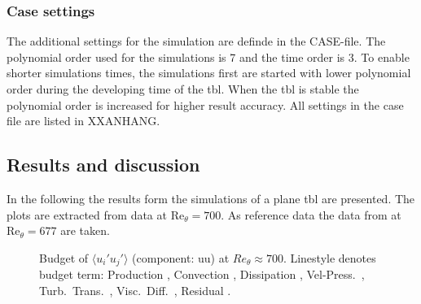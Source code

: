 \subsubsection{Case settings}

The additional settings for the simulation are definde in the CASE-file. 
The polynomial order used for the simulations is 7 and the time order is 3.
To enable shorter simulations times, the simulations first are started with lower polynomial order during the developing time of the \acrshort{tbl}.
When the \acrshort{tbl} is stable the polynomial order is increased for higher result accuracy.
All settings in the case file are listed in XXANHANG.

\subsection{Results and discussion}
In the following the results form the simulations of a plane \acrshort{tbl} are presented.
The plots are extracted from data at $\mathrm{Re}_{\theta} = 700$.
As reference data the data from \citet{schlatter_assessment_2010} at $\mathrm{Re}_{\theta} = 677$ are taken.

\begin{figure}[H]
\centering
\begin{subfigure}[t]{0.495\textwidth}
    \subcaption{}
    \centering
    
    \label{fig:planeTBLverifU}
\end{subfigure}
\hfill
\begin{subfigure}[t]{0.495\textwidth}
    \centering
    \subcaption{}
    
    \label{fig:planeTBLverifFluct}
\end{subfigure}
\begin{subfigure}[t]{0.495\textwidth}
    \centering
    \subcaption{}
    
    \label{fig:planeTBLverifBeta}
\end{subfigure}
\hfill
\begin{subfigure}[t]{0.495\textwidth}
    \centering
    \subcaption{}
    
    \label{fig:planeTBLverifBudget}
\end{subfigure}
\caption{Budget of $\langle u_i' u_j' \rangle$ (component: uu) at $Re_\theta \approx 700$.
Linestyle denotes budget term:
Production ,
Convection ,
Dissipation ,
Vel-Press.\ ,
Turb.\ Trans.\ ,
Visc.\ Diff.\ ,
Residual .}
\label{fig:planeTBLVerif}
\end{figure}

